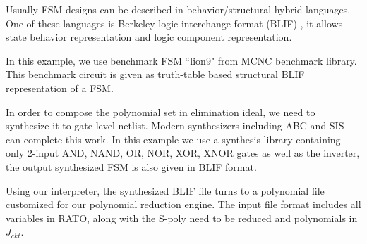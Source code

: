 Usually FSM designs can be described in behavior/structural hybrid languages.
One of these languages is Berkeley logic interchange format (BLIF) \cite{BLIF},
it allows state behavior representation and logic component representation.

\begin{Example}
In this example, we use benchmark FSM ``lion9" from MCNC benchmark library.
This benchmark circuit is given as truth-table based structural BLIF representation of a FSM.


In order to compose the polynomial set in elimination ideal, we need to synthesize it to 
gate-level netlist. Modern synthesizers including ABC \cite{brayton2010abc} and SIS \cite{SIS} 
can complete this work. In this example we use a synthesis library containing only 2-input 
AND, NAND, OR, NOR, XOR, XNOR gates as well as the inverter, the output synthesized FSM is also given in 
BLIF format.


Using our interpreter, the synthesized BLIF file turns to a polynomial file customized for our 
polynomial reduction engine. 
The input file format includes all 
variables in RATO, along with the S-poly need to be reduced and polynomials in $J_{ckt}$.
% 


\end{Example}
